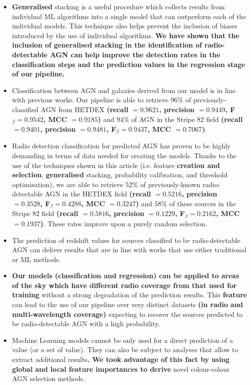 \documentclass{aa}
\begin{document}
\begin{itemize}
\item \textbf{Generalised} stacking is a useful procedure which collects results from individual ML algorithms into a single model that can outperform each of the individual models. This technique also helps prevent the inclusion of biases introduced by the use of individual algorithms. \textbf{We have shown that the inclusion of generalised stacking in the identification of radio-detectable AGN can help improve the detection rates in the classification steps and the prediction values in the regression stage of our pipeline.}
\item Classification between AGN and galaxies derived from our model is in line with previous works. Our pipeline is able to retrieve $96\%$ of previously-classified AGN from HETDEX \textbf{(recall $= 0.9621$, precision $= 0.9449$, F$_{\beta} = 0.9542$, MCC $= 0.9185$)} and $94\%$ of AGN in the Stripe 82 field \textbf{(recall $= 0.9401$, precision $= 0.9481$, F$_{\beta} = 0.9437$, MCC $= 0.7067$)}.
\item Radio detection classification for predicted AGN has proven to be highly demanding in terms of data needed for creating the models. Thanks to the use of the techniques shown in this article (i.e. feature \textbf{creation and selection}, \textbf{generalised} stacking, probability calibration, and threshold optimisation), we are able to retrieve $52\%$ of previously-known radio-detectable AGN in the HETDEX field \textbf{(recall $= 0.5216$, precision $= 0.3528$, F$_{\beta} = 0.4288$, MCC $= 0.3247$)} and $58\%$ of these sources in the Stripe 82 field \textbf{(recall $= 0.5816$, precision $= 0.1229$, F$_{\beta} = 0.2162$, MCC $= 0.1937$)}. These rates improve upon a purely random selection.
\item The prediction of redshift values for sources classified to be radio-detectable AGN can deliver results that are in line with works that use either traditional or ML methods.
\item \textbf{Our models (classification and regression) can be applied to areas of the sky which have different radio coverage from that used for training} without a strong degradation of the prediction results. This \textbf{feature} can lead to the use of our pipeline over very distinct datasets \textbf{(in radio and multi-wavelength coverage)} expecting to recover the sources predicted to be radio-detectable AGN with a high probability.
\item Machine Learning models cannot be only used for a direct prediction of a value (or a set of value). They can also be subject to analyses that allow to extract additional results\textbf{. We took advantage of this fact by using global and local feature importances to derive} novel colour-colour AGN selection methods.
\end{itemize}
\end{document}

